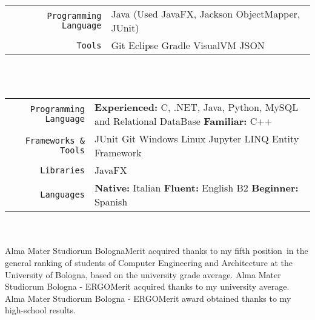 \documentclass[
    10pt,
    A4,
    english,
    draft = false,
    twoside = false,
]{article}
\begin{document}
	\tab \begin{tabular}{r p{}}
		\texttt{\large Programming Language} &  Java (Used JavaFX, Jackson ObjectMapper, JUnit) \\
		\texttt{\large Tools} & Git \cvContactSep Eclipse \cvContactSep Gradle \cvContactSep VisualVM \cvContactSep JSON \\
	\end{tabular}\\~\\
	{}
	{}
	{}
	\tab \begin{tabular}{r p{}}
		\texttt{\large Programming Language} & \textbf{Experienced:} C, .NET, Java, Python, MySQL and Relational DataBase \textbf{Familiar:} C++ \\
		\texttt{\large Frameworks \& Tools} & JUnit \cvContactSep Git \cvContactSep Windows \cvContactSep Linux \cvContactSep Jupyter \cvContactSep LINQ \cvContactSep Entity Framework \\
		\texttt{\large Libraries} & JavaFX\\
		\texttt{\large Languages} & \textbf{Native:} Italian \cvContactSep \textbf{Fluent:} English B2 \cvContactSep \textbf{Beginner:} Spanish \\
	\end{tabular}\\~\\
	\newpage
	{Alma Mater Studiorum Bologna}{Merit acquired thanks to my fifth position\ in the general ranking of students of Computer Engineering and Architecture
    at the University of Bologna, based on the university grade average.}
	{Alma Mater Studiorum Bologna - ERGO}{Merit acquired thanks to my university average.}
	{Alma Mater Studiorum Bologna - ERGO}{Merit award obtained thanks to my high-school results.}
	
\end{document}
